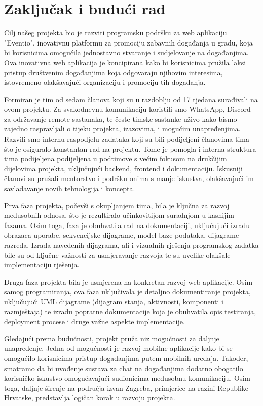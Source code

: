 \chapter{Zaključak i budući rad}
		
		Cilj našeg projekta bio je razviti programsku podršku za web aplikaciju "Eventio", inovativnu platformu za promociju zabavnih događanja u gradu, koja bi korisnicima omogućila jednostavno stvaranje i sudjelovanje na događanjima. Ova inovativna web aplikacija je koncipirana kako bi korisnicima pružila laksi pristup društvenim događanjima koja odgovaraju njihovim interesima, istovremeno olakšavajući organizaciju i promociju tih događanja.
		
		Formiran je tim od sedam članova koji su u razdoblju od 17 tjedana surađivali na ovom projektu. Za svakodnevnu komunikaciju koristili smo WhatsApp, Discord za održavanje remote sastanaka, te česte timske sastanke uživo kako bismo zajedno raspravljali o tijeku projekta, izazovima, i mogućim unapređenjima. Razvili smo internu raspodjelu zadataka koji su bili podijeljeni članovima tima što je osiguralo konstantan rad na projektu. Tome je pomogla i interna struktura tima podijeljena podijeljena u podtimove s većim fokusom na drukčijim dijelovima projekta, uključujući backend, frontend i dokumentaciju. Iskusniji članovi su pružali mentorstvo i podršku onima s manje iskustva, olakšavajući im savladavanje novih tehnologija i koncepta.
		
		Prva faza projekta, počevši s okupljanjem tima, bila je ključna za razvoj međusobnih odnosa, što je rezultiralo učinkovitijom suradnjom u kasnijim fazama. Osim toga, faza je obuhvatila rad na dokumentaciji, uključujući izradu obrazaca uporabe, sekvencijske dijagrame, model baze podataka, dijagrame razreda. Izrada navedenih dijagrama, ali i vizualnih rješenja programskog zadatka bile su od ključne važnosti za usmjeravanje razvoja te su uvelike olakšale implementaciju rješenja.
		
		Druga faza projekta bila je usmjerena na konkretan razvoj web aplikacije. Osim samog programiranja, ova faza uključivala je detaljno dokumentiranje projekta, uključujući UML dijagrame (dijagram stanja, aktivnosti, komponenti i razmještaja) te izradu popratne dokumentacije koja je obuhvatila opis testiranja, deployment procese i druge važne aspekte implementacije.
		
		Gledajući prema budućnosti, projekt pruža niz mogućnosti za daljnje unapređenje. Jedna od mogućnosti je razvoj mobilne aplikacije kako bi se omogućilo korisnicima pristup događanjima putem mobilnih uređaja. Također, smatramo da bi uvođenje sustava za chat na događanjima dodatno obogatilo korisničko iskustvo omogućavajući sudionicima međusobnu komunikaciju. Osim toga, daljnje širenje na područja izvan Zagreba, primjerice na razini Republike Hrvatske, predstavlja logičan korak u razvoju projekta.
		
